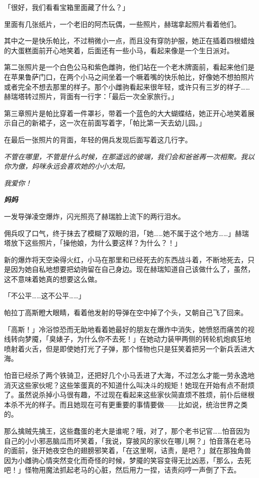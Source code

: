「很好，我们看看宝箱里面藏了什么？」

里面有几张纸片，一个老旧的阿杰玩偶，一些照片，赫瑞拿起照片看着他们。

其中之一是快乐帕比，不过稍微小一点，而且没有穿防护服，她正在插着四根蜡烛的大蛋糕面前开心地笑着，后面还有一些小马，看起来像是一个生日派对。

第二张照片是一个白色公马和紫色雌驹，他们站在一个老木牌面前，看起来他们是在苹果鲁萨门口，在两个小马之间坐着一个噘着嘴的快乐帕比，好像她不想拍照片或者完全不想去那里的样子。那个小雌驹看起来很年轻，或许只有三岁的样子……赫瑞塔转过照片，背面有一行字：「最后一次全家旅行。」

第三章照片是帕比穿着一件罩衫，带着一个蓝色的大大蝴蝶结，她正开心地笑着展示自己的新裙子，这一次在前面写着字，「帕比第一天去幼儿园。」

在最后一张照片的背面，年轻的佣兵发现后面写着这几行字。

\emph{不管在哪里，不管是什么时候，在那遥远的彼端，我们会和爸爸再一次相聚。我以你为傲，妈咪永远会喜欢她的小小太阳。}

\emph{我爱你！}

\emph{\textbf{妈妈}}

一发导弹凌空爆炸，闪光照亮了赫瑞脸上流下的两行泪水。

佣兵叹了口气，终于抹去了模糊了双眼的泪，「她……她不属于这个地方……」赫瑞塔放下这些照片，「操他娘，为什么要这样？为什么？！」

新的爆炸将天空染得火红，小马在那里和已经死去的东西战斗着，不断地死去，只是因为她自私地想要把幼驹留在自己身边。现在赫瑞知道自己该做什么了，虽然，这不意味着她真的想要这么做。

「不公平……这不公平……」

\horizonline

帕拉丁高斯瞪大眼睛，看着他发射的导弹在空中掉了个头，又朝自己飞了回来。

「高斯！」冷浴惊恐而无助地看着她最好的朋友在爆炸中消失，她愤怒而痛苦的视线转向梦魇，「臭婊子，为什么你不去死！」在她动力装甲两侧的转轮机炮疯狂地喷射着火舌，但是即使她打光了子弹，那个怪物也只是狂笑着把另一个新兵丢进大海。

怕音已经杀了两个铁骑卫，还把好几个小马丢进了大海，不过怎么才能一劳永逸地消灭这些家伙呢？这些笨蛋真的不知道什么叫决斗的规矩！她现在开始有点不耐烦了。虽然说杀掉小马很有趣，不过现在看起来这些家伙简直烦不胜烦，前仆后继根本杀不光的样子。而且她现在可有更重要的事情要做——比如说，统治世界之类的。

那么擒贼先擒王，这些蠢蛋的老大是谁呢？哦，对了，那个老书记官……怕音因为自己的小小邪恶脑瓜而坏笑着，「我说，穿披风的家伙在哪儿啊？」怕音落在老马的面前，张开她夜空色的翅膀邪笑着，「在这里啊，诘责，是吧？」就在那独角兽因为小雌驹心情突然变化而奇怪的时候，梦魇的笑容变得无比凶恶，「那么，去死吧！」怪物用魔法抓起老马的心脏，然后用力一捏，诘责闷哼一声倒了下去。

